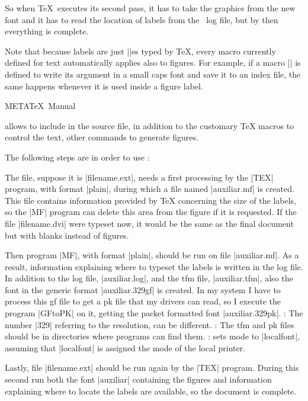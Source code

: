 So when \TeX\ executes its second pass, it has to take the graphics
from the new font and it has to read the location of labels from the
\MF\ log file, but by then everything is complete.

Note that because labels are just |\hbox|es typed by \TeX, every macro
currently defined for text automatically applies also to figures. For
example, if a macro |\person| is defined to write its argument in a
small caps font and save it to an index file, the same happens whenever
it is used inside a figure label.

\vfill\break

\centerline{\biglogo META\bigrm\TeX\ Manual}
\bigskip

{\MTeX} allows to include in the source file, in addition to the
customary {\TeX} macros to control the text, other commands to
generate {\MF} figures.

The following steps are in order to use {\MTeX}:

 The {\MTeX} file, suppose it is |filename.ext|, needs a first
processing by the |TEX| program, with format |plain|, during which a
{\MF} file named |auxiliar.mf| is created.  This {\MF} file contains
information provided by {\TeX} concerning the size of the labels, so
the |MF| program can delete this area from the figure if it is
requested.  If the file |filename.dvi| were typeset now, it would be
the same as the final document but with blanks instead of figures.

 Then program |MF|, with format |plain|, should be run on file
|auxiliar.mf|.  As a result, information explaining where to typeset
the labels is written in the log file.  In addition to the log file,
|auxiliar.log|, and the tfm file, |auxiliar.tfm|, also the font in
the generic format |auxiliar.329gf| is created.  In my system I have
to process this gf file to get a pk file that my drivers can read,
so I execute the program |GFtoPK| on it, getting the packet formatted
font |auxiliar.329pk|.  :  The number |329|
referring to the resolution, can be different.  :
The tfm and pk files should be in directories where programs can
find them.  :  {\MTeX} sets {\MF} mode to
|localfont|, assuming that |localfont| is assigned the mode of the
local printer.

 Lastly, file |filename.ext| should be run again by the |TEX|
program.  During this second run both the font |auxiliar| containing
the figures and information explaining where to locate the labels
are available, so the document is complete.

